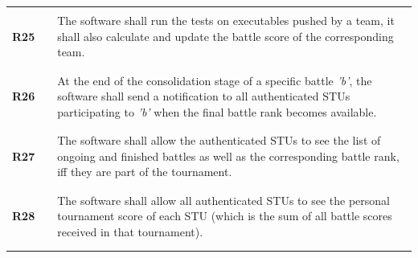 \begin{longtable}[H]{l l p{12cm}}
                 &        &                                                                                                                                                                                                                       \\\hline & & \\
    \textbf{R25} & \vline & The software shall run the tests on executables pushed by a team, it shall also calculate and update the battle score of the corresponding team.                                                                      \\
                 &        &                                                                                                                                                                                                                       \\\hline & & \\
    \textbf{R26} & \vline & At the end of the consolidation stage of a specific battle \textit{'b'}, the software shall send a notification to all authenticated STUs participating to \textit{'b'} when the final battle rank becomes available. \\
                 &        &                                                                                                                                                                                                                       \\\hline & & \\
    \textbf{R27} & \vline & The software shall allow the authenticated STUs to see the list of ongoing and finished battles as well as the corresponding battle rank, iff they are part of the tournament.                                        \\
                 &        &                                                                                                                                                                                                                       \\\hline & & \\
    \textbf{R28} & \vline & The software shall allow all authenticated STUs to see the personal tournament score of each STU (which is the sum of all battle scores received in that tournament).                                                 \\
                 &        &                                                                                                                                                                                                                       \\\hline & & \\

\end{longtable}
